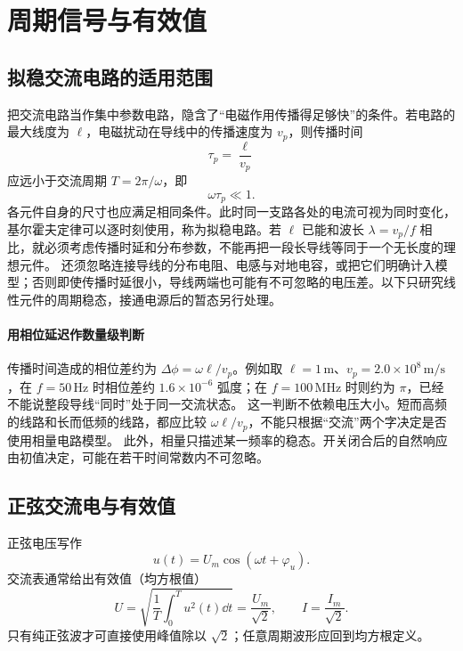 \section{周期信号与有效值}

\subsection{拟稳交流电路的适用范围}


把交流电路当作集中参数电路，隐含了“电磁作用传播得足够快”的条件。若电路的最大线度为 $\ell$，电磁扰动在导线中的传播速度为 $v_p$，则传播时间
\begin{equation}
 \tau_p=\frac{\ell}{v_p}
\end{equation}
应远小于交流周期 $T=2\pi/\omega$，即
\begin{equation}
 \omega\tau_p\ll1.
\end{equation}
各元件自身的尺寸也应满足相同条件。此时同一支路各处的电流可视为同时变化，基尔霍夫定律可以逐时刻使用，称为拟稳电路。若 $\ell$ 已能和波长 $\lambda=v_p/f$ 相比，就必须考虑传播时延和分布参数，不能再把一段长导线等同于一个无长度的理想元件。
还须忽略连接导线的分布电阻、电感与对地电容，或把它们明确计入模型；否则即使传播时延很小，导线两端也可能有不可忽略的电压差。以下只研究线性元件的周期稳态，接通电源后的暂态另行处理。


\paragraph{用相位延迟作数量级判断}
传播时间造成的相位差约为 $\Delta\phi=\omega\ell/v_p$。例如取 $\ell=1\,\mathrm m$、$v_p=2.0\times10^8\,\mathrm{m/s}$，在 $f=50\,\mathrm{Hz}$ 时相位差约 $1.6\times10^{-6}$ 弧度；在 $f=100\,\mathrm{MHz}$ 时则约为 $\pi$，已经不能说整段导线“同时”处于同一交流状态。
这一判断不依赖电压大小。短而高频的线路和长而低频的线路，都应比较 $\omega\ell/v_p$，不能只根据“交流”两个字决定是否使用相量电路模型。
此外，相量只描述某一频率的稳态。开关闭合后的自然响应由初值决定，可能在若干时间常数内不可忽略。


\subsection{正弦交流电与有效值}


正弦电压写作
\begin{equation}
 u(t)=U_m\cos(\omega t+\varphi_u).
\end{equation}
交流表通常给出有效值（均方根值）
\begin{equation}
 U=\sqrt{\frac1T\int_0^T u^2(t)\dd t}=\frac{U_m}{\sqrt2},
 \qquad I=\frac{I_m}{\sqrt2}.
\end{equation}
只有纯正弦波才可直接使用峰值除以 $\sqrt2$；任意周期波形应回到均方根定义。


